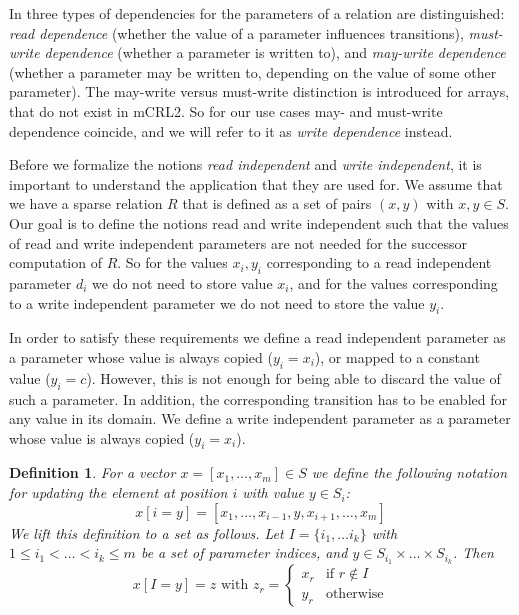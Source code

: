 \documentclass{article}
\newtheorem{definition}[theorem]{Definition}
\begin{document}
In \cite{DBLP:conf/hvc/MeijerKBP14} three types of dependencies for the parameters of a relation are distinguished: \emph{read dependence} (whether the value of a parameter influences transitions), \emph{must-write dependence} (whether a parameter
is written to), and \emph{may-write dependence} (whether a parameter may be written to, depending on the value of some other parameter). The may-write versus must-write distinction is introduced for arrays, that do not exist in mCRL2. So for our use
cases may- and must-write dependence coincide, and we will refer to it as
\emph{write dependence} instead.

\vspace{0.5cm}
\noindent
Before we formalize the notions \emph{read independent} and \emph{write independent}, it is important to understand the application that they are used for. We assume that we have a sparse relation $R$ that is defined as a set of pairs $(x,y)$ with $x,y \in S$.
Our goal is to define the notions read and write independent such that the values of read and write independent parameters are not needed for the successor computation of $R$. So for the values $x_i,y_i$ corresponding to a read independent parameter $d_i$ we do not need to store value $x_i$, and for the values corresponding to a write independent parameter we do not need to store the value $y_i$.

In order to satisfy these requirements we define a
read independent parameter as a parameter whose value is always copied ($y_i = x_i$), or mapped to a constant value ($y_i = c$). However, this is not enough for being able to discard the value of such a parameter. In addition, the corresponding transition has
to be enabled for any value in its domain. We define a write independent parameter as a parameter whose value is always copied  ($y_i = x_i$).

\begin{definition}
For a vector $x = [x_1, \ldots, x_m] \in S$ we define the following notation for updating the element at position $i$ with value $y \in S_i$:
\[
x[i=y] = [x_1, \ldots, x_{i-1}, y, x_{i+1}, \ldots, x_m]
\]
We lift this definition to a set as follows.
Let $I = \{ i_1, \ldots i_k \}$ with $1 \leq i_1 < \ldots < i_k \leq m$ be a set of parameter indices, and
$y \in S_{i_1} \times \ldots \times S_{i_k}$. Then
\[
x[I = y] = z \text{ with } z_r = 
  \left\{
    \begin{array}{ll}
         x_r & \text{if } r \notin I \\
         y_r & \text{otherwise}
    \end{array}
  \right. 
\]
\end{definition}
\end{document}
